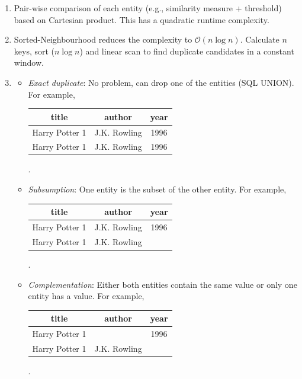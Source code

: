 \documentclass{scrartcl}
\begin{document}
	\begin{enumerate}
		\item Pair-wise comparison of each entity (e.g., similarity measure + threshold) based on Cartesian product.
		This has a quadratic runtime complexity.
		
		\item Sorted-Neighbourhood reduces the complexity to $\mathcal{O}(n\log n)$.
		Calculate $n$ keys, sort ($n\log n$) and linear scan to find duplicate candidates in a constant window.
		
		\item\phantom{phantom}
		\begin{itemize}
			\item \textit{Exact duplicate}: No problem, can drop one of the entities (SQL UNION).
			For example,
			\begin{center}
				\begin{tabular}{|c|c|c|}
					\hline
					title & author & year\\
					\hline
					Harry Potter 1 & J.K. Rowling & 1996\\
					Harry Potter 1 & J.K. Rowling & 1996\\
					\hline
				\end{tabular}.
			\end{center}
			
			\item \textit{Subsumption}: One entity is the subset of the other entity.
			For example,
			\begin{center}
				\begin{tabular}{|c|c|c|}
					\hline
					title & author & year\\
					\hline
					Harry Potter 1 & J.K. Rowling & 1996\\
					Harry Potter 1 & J.K. Rowling &\\
					\hline
				\end{tabular}.
			\end{center}
			
			\item \textit{Complementation}: Either both entities contain the same value or only one entity has a value.
			For example,
			\begin{center}
				\begin{tabular}{|c|c|c|}
					\hline
					title & author & year\\
					\hline
					Harry Potter 1 & & 1996\\
					Harry Potter 1 & J.K. Rowling &\\
					\hline
				\end{tabular}.
			\end{center}
				

\end{itemize}
\end{enumerate}
\end{document}
